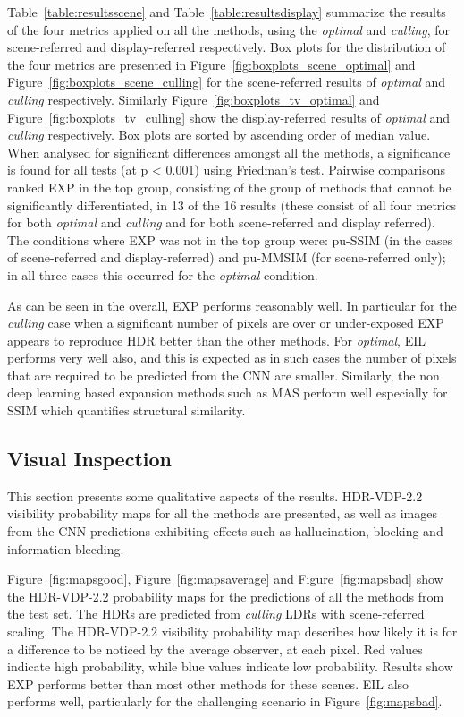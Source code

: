\documentclass{egpubl}
\newcommand{\tc}[1]{{#1}}
\begin{document}
Table~\ref{table:resultsscene} and Table~\ref{table:resultsdisplay} summarize
the results of the four metrics applied on all the methods, using the
\textit{optimal} and \textit{culling}, for scene-referred and display-referred
respectively. Box plots for the distribution of the four metrics are presented
in Figure~\ref{fig:boxplots_scene_optimal} and
Figure~\ref{fig:boxplots_scene_culling} for the scene-referred results of
\textit{optimal} and \textit{culling} respectively. Similarly
Figure~\ref{fig:boxplots_tv_optimal} and Figure~\ref{fig:boxplots_tv_culling}
show the display-referred results of \textit{optimal} and \textit{culling}
respectively. Box plots are sorted by ascending order of median value.
\tc{When analysed for significant differences amongst all the methods, a
significance is found for all tests (at p < 0.001) using Friedman's test.
Pairwise comparisons ranked EXP in the top group, consisting of the group of
methods that cannot be significantly differentiated, in 13 of the 16 results
(these consist of all four metrics for both \textit{optimal} and
\textit{culling} and for both scene-referred and display referred). The
conditions where EXP was not in the top group were: pu-SSIM (in the cases of
scene-referred and display-referred) and pu-MMSIM (for scene-referred only); in
all three cases this occurred for the \textit{optimal} condition.}

As can be seen in the overall, EXP performs reasonably well. In particular for
the \textit{culling} case when a significant number of pixels are over or
under-exposed EXP appears to reproduce HDR better than the other methods. For
\textit{optimal}, EIL performs very well also, and this is expected as in such
cases the number of pixels that are required to be predicted from the CNN are
smaller. Similarly, the non deep learning based expansion methods such as MAS
perform well especially for SSIM which quantifies structural similarity.


\subsection{\textbf{Visual Inspection}}\label{sec:comparemodels}

This section presents some qualitative aspects of the results. HDR-VDP-2.2
visibility probability maps for all the methods are presented, as well as
images from the CNN predictions exhibiting effects such as hallucination,
blocking and information bleeding.

Figure~\ref{fig:mapsgood}, Figure~\ref{fig:mapsaverage} and
Figure~\ref{fig:mapsbad} show the HDR-VDP-2.2 probability maps for the
predictions of all the methods from the test set. The HDRs are predicted from
\textit{culling} LDRs with scene-referred scaling. The HDR-VDP-2.2 visibility
probability map describes how likely it is for a difference to be noticed by
the average observer, at each pixel. Red values indicate high probability,
while blue values indicate low probability. Results show EXP performs better
than most other methods for these scenes. EIL also performs well, particularly
for the challenging scenario in Figure~\ref{fig:mapsbad}.
\end{document}
